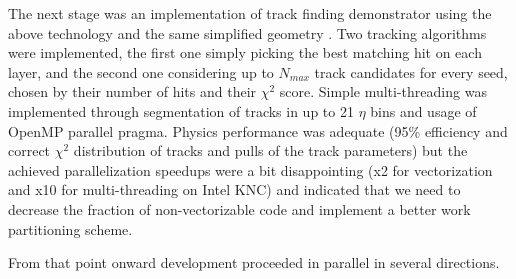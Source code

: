 \documentclass{webofc}
\begin{document}
The next stage was an implementation of track finding demonstrator using the
above technology and the same simplified geometry \cite{pkf-finding}. Two
tracking algorithms were implemented, the first one simply picking the best
matching hit on each layer, and the second one considering up to $N_{max}$
track candidates for every seed, chosen by their number of hits and their
$\chi^2$ score. Simple multi-threading was implemented through segmentation of
tracks in up to 21 $\eta$ bins and usage of OpenMP parallel pragma. Physics
performance was adequate (95\% efficiency and correct $\chi^2$ distribution of
tracks and pulls of the track parameters) but the achieved parallelization
speedups were a bit disappointing (x2 for vectorization and x10 for
multi-threading on Intel KNC) and indicated that we need to decrease the
fraction of non-vectorizable code and implement a better work partitioning
scheme.

From that point onward development proceeded in parallel in several
directions.
\end{document}
